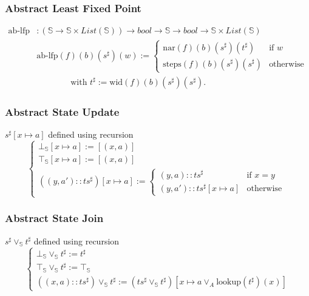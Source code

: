 \documentclass{beamer}
\begin{document}
        \begin{frame}
            \frametitle{Abstract Least Fixed Point}
            \begin{align*}
                \text{ab-lfp} &: (\mathbb{S} \to \mathbb{S} \times List(\mathbb{S})) \to bool \to \mathbb{S} \to bool \to \mathbb{S} \times List(\mathbb{S}) \\
                &\text{ab-lfp} (f) (b) (s^{\sharp}) (w) := \begin{cases}
                                                        \text{nar} (f) (b) (s^{\sharp}) (t^{\sharp})  & \text{if } w \\
                                                        \text{steps} (f) (b) (s^{\sharp}) (s^{\sharp}) & \text{otherwise}
                                                        \end{cases} \\
                & \qquad \qquad \text{with } t^{\sharp} := \text{wid} (f) (b) (s^{\sharp}) (s^{\sharp}).
            \end{align*}
            
        \end{frame}
        
        


\begin{frame}
    \frametitle{Abstract State Update}
    \( s^{\sharp}[x \mapsto a] \) defined using recursion
    \[ 
        \begin{cases}
            \bot_\mathbb{S}[x \mapsto a] := [(x, a)] \\
            \top_\mathbb{S}[x \mapsto a] := [(x, a)] \\
            ((y, a') :: ts^{\sharp})[x \mapsto a] := \begin{cases}
                (y, a) :: {ts}^{\sharp} & \text{if } x = y \\
                (y, a') :: ts^{\sharp}[x \mapsto a] & \text{otherwise}
                \end{cases}
                                        \end{cases}
    \]
\end{frame}


\begin{frame}
    \frametitle{Abstract State Join}
    \( s^{\sharp} \vee_\mathbb{S} t^{\sharp}\) defined using recursion
    \[
    \begin{cases}
        \bot_\mathbb{S} \vee_\mathbb{S} t^{\sharp} := t^{\sharp} \\  
        \top_\mathbb{S} \vee_\mathbb{S} t^{\sharp} := \top_\mathbb{S} \\
        ((x, a) :: {ts}^{\sharp}) \vee_\mathbb{S} t^{\sharp} := ({ts}^{\sharp} \vee_\mathbb{S} t^{\sharp})[x \mapsto a \vee_A \text{lookup} (t^{\sharp}) (x)]
                                                    \end{cases} \]
\end{frame}
\end{document}
